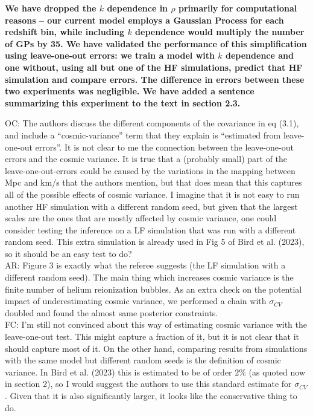 \documentclass[12pt]{article}
\begin{document}
\textbf{We have dropped the $k$ dependence in $\rho$ primarily for computational reasons -- our current model employs a Gaussian Process for each redshift bin, while including $k$ dependence would multiply the number of GPs by 35. We have validated the performance of this simplification using leave-one-out errors: we train a model with $k$ dependence and one without, using all but one of the HF simulations, predict that HF simulation and compare errors. The difference in errors between these two experiments was negligible. We have added a sentence summarizing this experiment to the text in section 2.3.}\\

\hrulefill \newline

OC: The authors discuss the different components of the covariance in eq (3.1), and include a “cosmic-variance” term that they explain is “estimated from leave-one-out errors”. It is not clear to me the connection between the leave-one-out errors and the cosmic variance. It is true that a (probably small) part of the leave-one-out-errors could be caused by the variations in the mapping between Mpc and km/s that the authors mention, but that does mean that this captures all of the possible effects of cosmic variance. I imagine that it is not easy to run another HF simulation with a different random seed, but given that the largest scales are the ones that are mostly affected by cosmic variance, one could consider testing the inference on a LF simulation that was run with a different random seed. This extra simulation is already used in Fig 5 of Bird et al. (2023), so it should be an easy test to do?\\

AR: Figure 3 is exactly what the referee suggests (the LF simulation with a different random seed). The main thing which increases cosmic variance is the finite number of helium reionization bubbles. As an extra check on the potential impact of underestimating cosmic variance, we performed a chain with $\sigma_{CV}$ doubled and found the almost same posterior constraints.\\

FC: I’m still not convinced about this way of estimating cosmic variance with the leave-one-out test. This might capture a fraction of it, but it is not clear that it should capture most of it. On the other hand, comparing results from simulations with the same model but different random seeds is the definition of cosmic variance. In Bird et al. (2023) this is estimated to be of order $2\%$ (as quoted now in section 2), so I would suggest the authors to use this standard estimate for $\sigma_{CV}$. Given that it is also significantly larger, it looks like the conservative thing to do.
\end{document}
